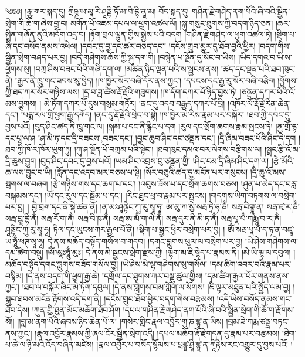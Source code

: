 \setcounter{footnote}{0} 
༄༅༅། །རྒྱ་གར་སྐད་དུ། ཀྲྀཥྞ་ཡ་མཱ་རི་ཤཱནྟི་ཧོ་མ་བི་དྷི་ནཱ་མ། བོད་སྐད་དུ། གཤིན་རྗེ་གཤེད་ནག་པོའི་ཞི་བའི་སྦྱིན་སྲེག་གི་ཆོ་ག་ཞེས་བྱ་བ། མགོན་པོ་འཇམ་དཔལ་ལ་ཕྱག་འཚལ་ལོ། །སྐུ་གསུང་ཐུགས་ཀྱི་བདག་ཉིད་ཅན། །ཆར་སྤྲིན་གཞོན་ནུའི་མདོག་འདྲ་བ། །རྟོག་བྲལ་ལྷུན་གྱིས་སྐྱེས་པའི་བདག །གཤིན་རྗེ་གཤེད་ལ་ཕྱག་འཚལ་ཏེ། །སྡིག་པ་ཞི་དང་བསོད་ནམས་འཕེལ། །དབང་དུ་བྱ་དང་ཚར་བཅད་དང་། །དངོས་གྲུབ་མྱུར་དུ་ཐོབ་བྱའི་ཕྱིར། །བདག་གིས་སྦྱིན་སྲེག་བཤད་པར་བྱ། །བདེ་གཤེགས་ཆོས་ཀྱི་སྐུ་དག་གི། །བསྙེན་པ་སྔོན་དུ་སོང་བ་ཡིས། །ཡིད་དགའ་བ་ཡི་ས་ཕྱོགས་སུ། །བཀྲ་ཤིས་བཟང་པོའི་གཞི་དག་ལ། །མཚན་ཉིད་ལྡན་པའི་ས་སྦྱངས་ནས། །ཚད་དང་ལྡན་པའི་ཐབ་ཁུང་ནི། །རྒྱར་ནི་ཁྲུ་གང་ཟབས་སུ་ཕྱེད། །ཁ་ཁྱེར་སོར་བཞི་དོར་ནས་ཀྱང་། །དཔངས་དང་རྒྱ་རུ་སོར་བཞི་བརྩིག །ཕྱོགས་ཀྱི་ཐད་ཀར་སོར་གཉིས་ལས། །དྲ་བ་ཟླ་ཚེས་རྡོ་རྗེའི་གཟུགས། །ཁ་དོག་དཀར་པོ་ཉིད་བྱས་ཏེ། །ཙནྡན་དཀར་པོའི་འོ་མས་བྱུགས། ། མེ་ཏོག་དཀར་པོ་དུས་གསུམ་གཏོར། །ནང་དུ་འདབ་བརྒྱད་དཀར་པོ་བྲི། །འཁོར་ལོ་རྡོ་རྗེ་རིན་ཆེན་དང་། །པདྨ་རལ་གྲི་ཕྱག་རྒྱ་དགོད། །ནང་དུ་རྡོ་རྗེའི་ཕྲེང་བ་སྟེ། །ཁ་ཁྱེར་མེ་རིས་རྣམ་པར་བསྐོར། །ཐབ་ཀྱི་དབང་དུ་བྱས་པའོ། །བུད་ཤིང་ཚད་ནི་ཁྲུ་གང་ལ། །སྐམ་པ་དང་ནི་རྙིང་པ་དག །རུལ་དང་སྲོག་ཆགས་རྣམ་སྤངས་ཏེ། །ནྱ་གྲོ་དྷ་དང་པཱ་ལ་ཤ །ཤ་མི་ཏ་དང་དྲི་{བཟངས་,བཟང་}དང་། །བྱང་ཆུབ་ཤིང་དང་ཙནྡན་དང་། །དྲི་ཞིམ་བཟང་པོའི་ཤིང་དེ་དག །ཐབ་ཀྱི་ཁོ་ར་ཁོར་ཡུག་ཏུ། །ཀུ་ཤ་སྔོན་པོ་བཀྲམ་པའི་སྟེང་། །ཐབ་ཁུང་དམའ་བར་ལེགས་བརྩིགས་ལ། །སྦྲང་རྩི་འོ་མ་དྲི་ཆུས་བྱུག །བུད་ཤིང་དབང་དུ་བྱས་པའོ། །ཡམ་ཤིང་འབྲས་བུ་ཙནྡན་གྱི། །ཤིང་ངམ་དྲི་ཞིམ་ཤིང་དག་ལ། །རྩེ་མོའི་ཆ་ལས་བྱུང་བ་ཡི། །རློན་དང་འདབ་མར་བཅས་པ་སྟེ། །སོར་བཅུའི་ཚད་དུ་མངོན་པར་གསུངས། །དྲི་ཆུ་འོ་མས་སྦགས་ལ་བཞག །རྩེ་གཉིས་གས་དང་ཆག་པ་དང་། །འབུས་ཟོས་པ་དང་སྲོག་ཆགས་བཅས། །ཤུན་པ་མེད་དང་བརླ་བསྐམས་དང་། །ཡོ་དང་རུལ་དང་སྦོམ་པ་དང་། །རིང་ཐུང་ཕྲ་བ་རྣམ་པར་སྤངས། །གདགས་ཡིག་བཏགས་ལ་བསྲེག་པར་བྱ། ། བྱེ་བྲག་དང་ནི་སྡེ་ཚན་ནོ། །ན་མཿཤཱནྟིང་ཀུ་རུ་སྭཱ་ཧཱ། ཨ་མུ་ཀ་སྱེ་སརྦ་ཏྲེ་ཧ་ཎྃ། སརྦ་བིགྷྣཱ་ན། སརྦ་ཛྭ་ར་ཎྃ། སརྦ་བྱཱ་དྷི་ནྃ། སརྦ་རོ་ག་ནྃ། སརྦ་བི་ཥ་ནྃ། སརྦ་ཨ་མྃ་ག་ལེ་ནྃ། སརྦ་དུར་ནི་མི་ཏ་ནྃ། སརྦ་པཱ་པྃ་ཀརྨཱ་བ་ར་ཎྃ། ཤཱནྟིང་ཀུ་རུ་སྭཱ་ཧཱ། ཏིལ་དང་ཡུངས་ཀར་རྒྱལ་པོ་ནི། །སྡིག་པ་སྦྱང་ཕྱིར་བསྲེག་པར་བྱ། །
ཨོཾ་སརྦ་པཱ་པྃ་ད་ཧ་ན་བཛྲཱ་ཡ་ཧཱུྃ་ཕཊ་སྭཱ་ཧཱ། དེ་ནས་མཆོད་བསྟོད་གསོལ་བ་གདབ། །དགང་བླུགས་ཕུལ་ལ་བསྲེག་པར་བྱ། །ཡེ་ཤེས་གཤེགས་ལ་དམ་ཚིག་བསྡུ། །ཨོཾ་ཨཱཿཧཱུྃ་མུཿ། དེ་ནས་མེ་སྦྱངས་སྲེག་རྫས་ཀྱི། །ལྷག་མ་ཇི་སྙེད་པ་རྣམས་ནི། །མེ་ཡི་ལྷ་ལ་དབུལ། །མཆོད་བསྟོད་དགང་བླུགས་བཟོད་གསོལ་བྱ། །ཡེ་ཤེས་མེ་ལྷ་གཤེགས་སུ་གསོལ། །དམ་ཚིག་འབར་བའི་རྣམ་པར་བསྟིམ། །དེ་ནས་བདག་གི་ཕྱག་རྒྱ་ཆེ། །དགྲོལ་དང་ཐུགས་ཀར་བསྡུ་ཚུལ་གྱིས། །དམ་ཚིག་རྒྱལ་པོར་གནས་ནས་ཀྱང་། །ཐབ་ལ་བསྐོར་ཞིང་མེ་ཏོག་དབུལ། །དེ་ནས་གླེགས་བམ་ཀློག་ལ་སོགས། །ཇི་ལྟར་མཐུན་པའི་སྤྱོད་ལམ་བྱ། །སྒྲུབ་ཐབས་མངོན་རྟོགས་འདི་དག་ནི། །དངོས་གྲུབ་ཐོབ་ཕྱིར་བདག་གིས་བརྩམས། །འདི་ཡིས་བསོད་ནམས་གང་ཐོབ་དེས། །ཀུན་གྱི་ཐུན་མོང་མཆོག་ཐོབ་ཤོག །དཔལ་གཤིན་རྗེ་གཤེད་ནག་པོའི་ཞི་བའི་སྦྱིན་སྲེག་གི་ཆོ་ག་རྫོགས་སོ།། །།བླ་མ་ནག་པོའི་ཞབས་ཉིད་ཆེན་པོ་ལ། །གསེར་གླིང་རྣལ་འབྱོར་གུ་ཎ་ཛྙཱ་ན་ཡིས། །བྲམ་ཟེ་ཀརྨ་ཙནྡྲ་བཏང་ནས་ཀྱང་། །རྣལ་འབྱོར་རྣམས་ཀྱི་ཞལ་ངོར་སྦྱིན་སྲེག་འདི། །དཔལ་མཆོག་རྡོ་རྗེ་གདན་དུ་རྣམ་པར་བརྩམས། །ཐེག་པ་ཆེ་ལ་ཉི་མའི་འོད་བཞིན་མཛེས། །རྣལ་འབྱོར་པ་བསོད་སྙོམས་པ་པྲཛྙཱ་ཤྲཱི་ཛྙཱ་ན་ཀཱིརྟིས་རང་འགྱུར་དུ་བྱས་པའོ། །
